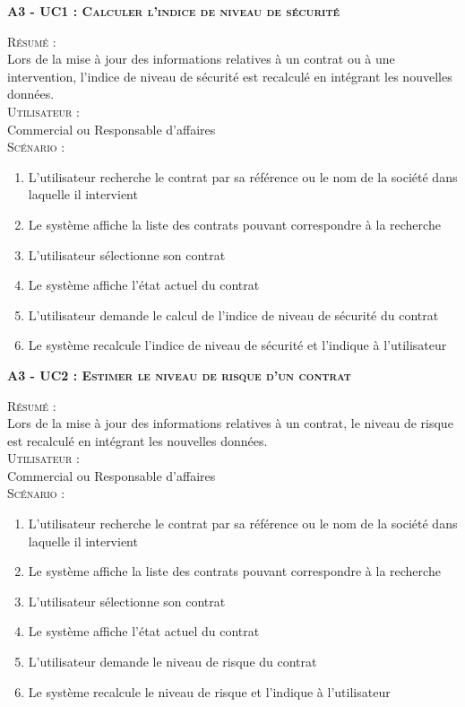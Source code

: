 \noindent\textsc{\bf{A3 - UC1 :} Calculer l’indice de niveau de sécurité}
\begin{shaded}
\noindent\textsc{Résumé :}\\

Lors de la mise à jour des informations relatives à un contrat ou à une intervention, l’indice de niveau de sécurité est recalculé en intégrant les nouvelles données. \\

\noindent\textsc{Utilisateur :} \\

Commercial ou Responsable d’affaires \\

\noindent\textsc{Scénario :} \\
\begin{enumerate}
    \item L’utilisateur recherche le contrat par sa référence ou le nom de la société dans laquelle il intervient
    \item Le système affiche la liste des contrats pouvant correspondre à la recherche
    \item L’utilisateur sélectionne son contrat
    \item Le système affiche l’état actuel du contrat
    \item L’utilisateur demande le calcul de l’indice de niveau de sécurité du contrat
    \item Le système recalcule l’indice de niveau de sécurité et l’indique à l’utilisateur
\end{enumerate}
\end{shaded}

\noindent\textsc{\bf{A3 - UC2 :} Estimer le niveau de risque d’un contrat}
\begin{shaded}
\noindent\textsc{Résumé :}\\

Lors de la mise à jour des informations relatives à un contrat, le niveau de risque est recalculé en intégrant les nouvelles données. \\

\noindent\textsc{Utilisateur :} \\

Commercial ou Responsable d’affaires \\

\noindent\textsc{Scénario :} \\
\begin{enumerate}
    \item L’utilisateur recherche le contrat par sa référence ou le nom de la société dans laquelle il intervient
    \item Le système affiche la liste des contrats pouvant correspondre à la recherche
    \item L’utilisateur sélectionne son contrat
    \item Le système affiche l’état actuel du contrat
    \item L’utilisateur demande le niveau de risque du contrat
    \item Le système recalcule le niveau de risque et l’indique à l’utilisateur
\end{enumerate}
\end{shaded}

